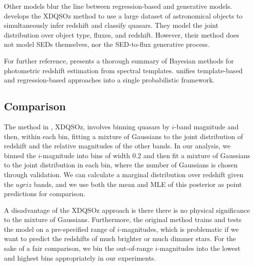 \documentclass{article} %
\begin{document}
Other models blur the line between regression-based and generative models. \cite{bovy2012photometric} develops the XDQSOz method to use a large dataset of astronomical objects to simultaneously infer redshift and classify quasars.  
They model the joint distribution over object type, fluxes, and redshift.  However, their method does not model SEDs themselves, nor the SED-to-flux generative process. 

For further reference, \cite{benitez2000bayesian} presents a thorough summary of Bayesian methods for photometric redshift estimation from spectral templates.  \cite{budavari2009unified} unifies template-based and regression-based approaches into a single probabilistic framework. 

\subsection{Comparison}
The method in \cite{bovy2012photometric}, XDQSOz, involves binning
quasars by $i$-band magnitude and then, within each bin,
fitting a mixture of Gaussians to the joint distribution of
redshift and the relative magnitudes of the other bands. In our analysis, we binned
the $i$-magnitude
into bins of width 0.2 and then fit a mixture of Gaussians to the joint distribution in each bin,
where the number of Gaussians is chosen through validation. We can calculate a marginal distribution
over redshift given the $ugriz$ bands, and we use both the mean and MLE of this posterior as
point predictions for comparison.

A disadvantage of the XDQSOz approach is there there is no physical significance to the mixture
of Gaussians. 
Furthermore, the original method trains and tests the model on a pre-specified range of $i$-magnitudes, which is problematic if we want to predict
the redshifts of much brighter or much dimmer stars. For the sake of a fair comparison, we bin
the out-of-range $i$-magnitudes into the lowest and highest bins appropriately in our experiments.
\end{document}
